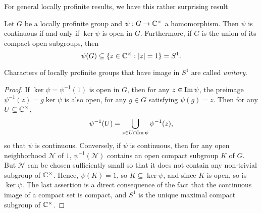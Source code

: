 For general locally profinite results, we have this rather surprising result
\begin{lemma}\label{lem_cont_chars}
    Let $G$ be a locally profinite group and $\psi: G\rightarrow\mathbb{C}^{\times}$ a homomorphism. Then $\psi$ is continuous if and only if $\ker\psi$ is open in $G$. Furthermore, if $G$ is the union of its compact open subgroups, then $$\psi(G)\subseteq\{z\in\mathbb{C}^{\times}:|z|=1\}=S^1.$$
\end{lemma}
\begin{rem}
    Characters of locally profinite groups that have image in $S^1$ are called \textit{unitary}.
\end{rem}
\begin{proof}
    If $\ker\psi=\psi^{-1}(1)$ is open in $G$, then for any $z\in\operatorname{Im}\psi$, the preimage $\psi^{-1}(z)=g\ker\psi$ is also open, for any $g \in G$ satisfying $\psi(g)=z$. Then for any $U\subseteq\mathbb{C}^{\times}$, 
    $$\psi^{-1}(U)=\bigcup_{z\in U\cap\operatorname{Im}\psi}\psi^{-1}(z),$$
    so that $\psi$ is continuous.
    Conversely, if $\psi$ is continuous, then for any open neighborhood $\mathcal{N}$ of $1$, $\psi^{-1}(\mathcal{N})$ contains an open compact subgroup $K$ of $G$. But $\mathcal{N}$ can be chosen sufficiently small so that it does not contain any non-trivial subgroup of $\mathbb{C}^{\times}$. Hence, $\psi(K)=1$, so $K\subseteq\ker\psi$, and since $K$ is open, so is $\ker\psi$.
    The last assertion is a direct consequence of the fact that the continuous image of a compact set is compact, and $S^1$ is the unique maximal compact subgroup of $\mathbb{C}^{\times}$.
\end{proof}

